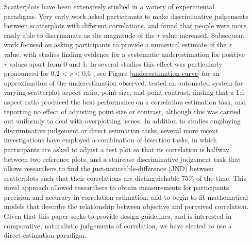 \documentclass[preprint, 3p,
authoryear]{elsarticle} %
\begin{document}
Scatterplots have been extensively studied in a variety of experimental
paradigms. Very early work \citep{pollack_1960} asked participants to
make discriminative judgements between scatterplots with different
correlations, and found that people were more easily able to
discriminate as the magnitude of the \emph{r} value increased.
Subsequent work focused on asking participants to provide a numerical
estimate of the \emph{r} value, with studies finding evidence for a
systematic underestimation for positive \emph{r} values apart from 0 and
1. In several studies this effect was particularly pronounced for 0.2
\textless{} \emph{r} \textless{} 0.6
\citep{strahan_1978, bobko_1979, cleveland_1982, lane_1985, lauer_1989, collyer_1990, meyer_1992},
see Figure \ref{underestimation-curve} for an approximation of the
underestimation observed. \citet{micallef_2017} tested an automated
system for varying scatterplot aspect ratio, point size, and point
contrast, finding that a 1:1 aspect ratio produced the best performance
on a correlation estimation task, and reporting no effect of adjusting
point size or contrast, although this was carried out uniformly to deal
with overplotting issues. In addition to studies employing
discriminative judgement or direct estimation tasks, several more recent
investigations have employed a combination of bisection tasks, in which
participants are asked to adjust a test plot so that its correlation is
halfway between two reference plots, and a staircase discriminative
judgement task that allows researchers to find the
just-noticeable-difference (JND) between scatterplots such that their
correlations are distinguishable 75\% of the time. This novel approach
\citep{rensink_2010} allowed researchers to obtain measurements for
participants' precision and accuracy in correlation estimation, and to
begin to fit mathematical models that describe the relationship between
objective and perceived correlation. Given that this paper seeks to
provide design guidelines, and is interested in comparative,
naturalistic judgements of correlation, we have elected to use a direct
estimation paradigm.
\end{document}
